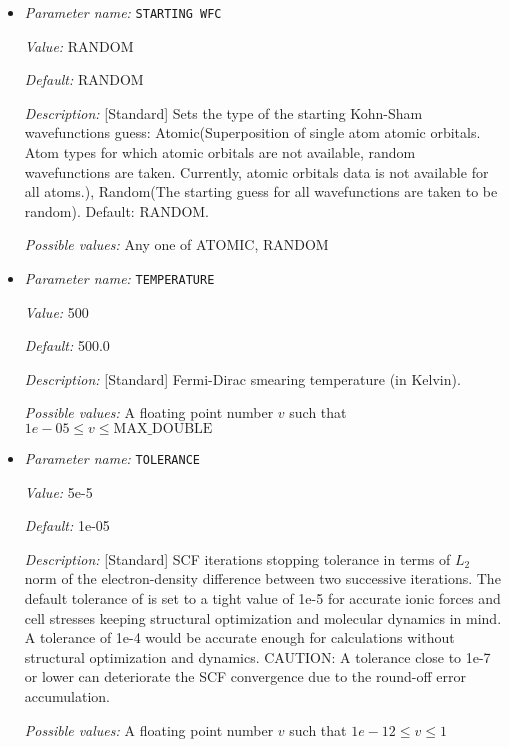 \begin{itemize}
{\it Default:} 0.0


{\it Description:} [Standard] Mixing parameter to be used in density mixing schemes. For default value of 0.0, it is heuristically set for different mixing schemes (0.2 for Anderson and Broyden, and 0.5 for Kerker and LRD.


{\it Possible values:} A floating point number $v$ such that $-1e-12 \leq v \leq 1$
\item {\it Parameter name:} {\tt STARTING WFC}
\label{parameters:SCF parameters/STARTING WFC}
\label{parameters:SCF_20parameters/STARTING_20WFC}


{\it Value:} RANDOM


{\it Default:} RANDOM


{\it Description:} [Standard] Sets the type of the starting Kohn-Sham wavefunctions guess: Atomic(Superposition of single atom atomic orbitals. Atom types for which atomic orbitals are not available, random wavefunctions are taken. Currently, atomic orbitals data is not available for all atoms.), Random(The starting guess for all wavefunctions are taken to be random). Default: RANDOM.


{\it Possible values:} Any one of ATOMIC, RANDOM
\item {\it Parameter name:} {\tt TEMPERATURE}
\label{parameters:SCF parameters/TEMPERATURE}
\label{parameters:SCF_20parameters/TEMPERATURE}


{\it Value:} 500


{\it Default:} 500.0


{\it Description:} [Standard] Fermi-Dirac smearing temperature (in Kelvin).


{\it Possible values:} A floating point number $v$ such that $1e-05 \leq v \leq \text{MAX\_DOUBLE}$
\item {\it Parameter name:} {\tt TOLERANCE}
\label{parameters:SCF parameters/TOLERANCE}
\label{parameters:SCF_20parameters/TOLERANCE}


{\it Value:} 5e-5


{\it Default:} 1e-05


{\it Description:} [Standard] SCF iterations stopping tolerance in terms of $L_2$ norm of the electron-density difference between two successive iterations. The default tolerance of is set to a tight value of 1e-5 for accurate ionic forces and cell stresses keeping structural optimization and molecular dynamics in mind. A tolerance of 1e-4 would be accurate enough for calculations without structural optimization and dynamics. CAUTION: A tolerance close to 1e-7 or lower can deteriorate the SCF convergence due to the round-off error accumulation.


{\it Possible values:} A floating point number $v$ such that $1e-12 \leq v \leq 1$
\end{itemize}



